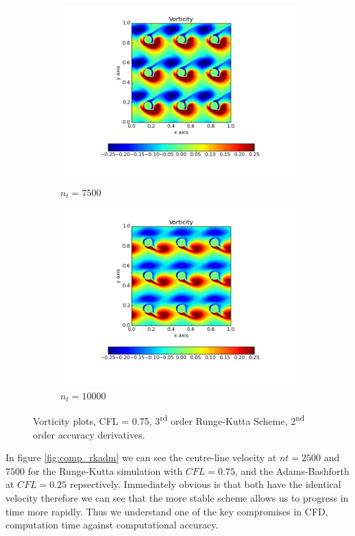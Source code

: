 \documentclass[10pt, a4paper]{article}
\begin{document}
\begin{figure}[!htb]
\begin{subfigure}{.5\textwidth}
  \includegraphics[width=1.1\linewidth, clip=true, trim=1cm 2cm 1cm 1cm]{q3_0003}
  \caption{$n_t = 7500$}
\end{subfigure}%
\begin{subfigure}{.5\textwidth}
  \centering
  \includegraphics[width=1.1\linewidth, clip=true, trim=1cm 2cm 1cm 1cm]{q3_0004}
  \caption{$n_t = 10000$}
\end{subfigure}
\caption{Vorticity plots, CFL = 0.75, 3\textsuperscript{rd} order Runge-Kutta Scheme, 2\textsuperscript{nd} order accuracy derivatives.}
\label{fig:q3}
\end{figure}

In figure \ref{fig:comp_rkadm} we can see the centre-line velocity at $nt = 2500$ and $7500$ for the Runge-Kutta simulation with $CFL =  0.75$, and the Adams-Bashforth at $CFL = 0.25$ repsectively. Immediately obvious is that both have the identical velocity therefore we can see that the more stable scheme allows us to progress in time more rapidly. Thus we understand one of the key compromises in CFD, computation time against computational accuracy.
\end{document}
